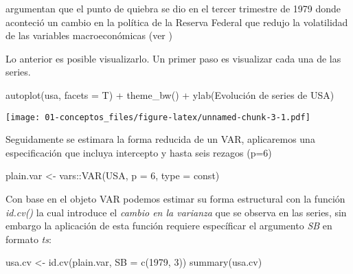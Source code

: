 \documentclass[
]{book}
\newenvironment{Shaded}{\begin{snugshade}}{\end{snugshade}}
\newcommand{\AttributeTok}[1]{\textcolor[rgb]{0.77,0.63,0.00}{#1}}
\newcommand{\DecValTok}[1]{\textcolor[rgb]{0.00,0.00,0.81}{#1}}
\newcommand{\FunctionTok}[1]{\textcolor[rgb]{0.00,0.00,0.00}{#1}}
\newcommand{\NormalTok}[1]{#1}
\newcommand{\OtherTok}[1]{\textcolor[rgb]{0.56,0.35,0.01}{#1}}
\newcommand{\SpecialCharTok}[1]{\textcolor[rgb]{0.00,0.00,0.00}{#1}}
\newcommand{\StringTok}[1]{\textcolor[rgb]{0.31,0.60,0.02}{#1}}
\begin{document}
\citet{Herwartz2016} argumentan que el punto de quiebra se dio en el tercer trimestre de 1979 donde aconteció un cambio en la política de la Reserva Federal que redujo la volatilidad de las variables macroeconómicas (ver \citet{Stock2003})

Lo anterior es posible visualizarlo.
Un primer paso es visualizar cada una de las series.

\begin{Shaded}
\begin{Highlighting}[]
\FunctionTok{autoplot}\NormalTok{(usa, }\AttributeTok{facets =}\NormalTok{ T) }\SpecialCharTok{+} \FunctionTok{theme\_bw}\NormalTok{() }\SpecialCharTok{+} \FunctionTok{ylab}\NormalTok{(}\StringTok{\textquotesingle{}Evolución de series de USA\textquotesingle{}}\NormalTok{)}
\end{Highlighting}
\end{Shaded}

\texttt{[image: 01-conceptos\_files/figure-latex/unnamed-chunk-3-1.pdf]}

Seguidamente se estimara la forma reducida de un VAR, aplicaremos una especificación que incluya intercepto y hasta seis rezagos (p=6)

\begin{Shaded}
\begin{Highlighting}[]
\NormalTok{plain.var }\OtherTok{\textless{}{-}}\NormalTok{ vars}\SpecialCharTok{::}\FunctionTok{VAR}\NormalTok{(USA, }\AttributeTok{p =} \DecValTok{6}\NormalTok{, }\AttributeTok{type =} \StringTok{\textquotesingle{}const\textquotesingle{}}\NormalTok{)}
\end{Highlighting}
\end{Shaded}

Con base en el objeto VAR podemos estimar su forma estructural con la función \emph{id.cv()} la cual introduce el \emph{cambio en la varianza} que se observa en las series, sin embargo la aplicación de esta función requiere específicar el argumento \emph{SB} en formato \emph{ts}:

\begin{Shaded}
\begin{Highlighting}[]
\NormalTok{usa.cv }\OtherTok{\textless{}{-}} \FunctionTok{id.cv}\NormalTok{(plain.var, }\AttributeTok{SB =} \FunctionTok{c}\NormalTok{(}\DecValTok{1979}\NormalTok{, }\DecValTok{3}\NormalTok{))}
\FunctionTok{summary}\NormalTok{(usa.cv)}
\end{Highlighting}
\end{Shaded}
\end{document}
